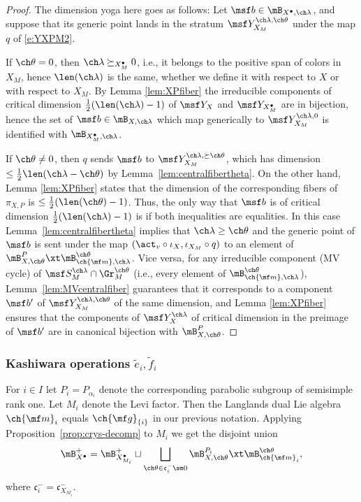 \begin{proof}
The dimension yoga here goes as follows:
Let $\msf b \in \mB_{X^\bullet, \ch\lambda}$, and suppose that its generic point lands in the stratum $\msf Y^{\ch\lambda,\ch\theta}_{X_M}$ under the map $q$ of \eqref{e:YXPM2}.

If $\ch\theta =0$, then $\ch\lambda \succeq_{X_M^\bullet} 0$, i.e., it belongs to the positive span of colors in $X_M$, hence $\len(\ch\lambda)$ is the same, whether we define it with respect to $X$ or with respect to $X_M$. By Lemma \ref{lem:XPfiber} the irreducible components of critical dimension $\frac{1}{2} (\len(\ch\lambda) - 1)$ of $\msf Y_X$ and $\msf Y_{X_M^\bullet}$ are in bijection, hence the set of $\msf b \in \mB_{X,\ch\lambda}$ which map generically to $\msf Y^{\ch\lambda,0}_{X_M}$ is identified with $\mB_{X_M^\bullet,\ch\lambda}$.

If $\ch\theta \ne 0$, then $q$ sends $\msf b$ to $\msf Y^{\ch\lambda, \succeq \ch\theta}_{X_M}$,
which has dimension $\le \frac 1 2 \len(\ch\lambda-\ch\theta)$ by Lemma~\ref{lem:centralfibertheta}.
On the other hand, Lemma \ref{lem:XPfiber} states that the dimension of the corresponding fibers of $\pi_{X,P}$ is $\le \frac{1}{2} (\len(\ch\theta)-1)$. Thus, the only way that $\msf b$ is of critical dimension $\frac{1}{2} (\len(\ch\lambda)-1)$ is if both inequalities are equalities.
In this case Lemma~\ref{lem:centralfibertheta} implies that $\ch\lambda \ge \ch\theta$
and the generic point of $\msf b$ is sent under the map $(\act_v\circ \iota_X,\iota_{X_M}\circ q)$ to an element of $\mB^P_{X,\ch\theta} \xt \mB_{\ch{\mf m}, \ch\lambda}^{\ch\theta}$. Vice versa, for any irreducible component (MV cycle) of  $\msf S^{\ch\lambda}_M\cap \Gr_M^{\ch\theta}$ (i.e., every element of $\mB_{\ch{\mf m},\ch\lambda}^{\ch\theta}$),
Lemma~\ref{lem:MVcentralfiber} guarantees that it corresponds to a component $\msf b'$ of $\msf Y_{X_M}^{\ch\lambda,\ch\theta}$ of the same dimension, and Lemma \ref{lem:XPfiber} ensures that the components of $\msf Y^{\ch\lambda}_X$ of critical dimension in the preimage of $\msf b'$ are in canonical bijection with $\mB^P_{X,\ch\theta}$.
\end{proof}


\subsubsection{Kashiwara operations $\tilde e_i, \tilde f_i$} \label{sect:crystal-ef}
For $i\in I$ let $P_i = P_{\alpha_i}$ denote the corresponding parabolic subgroup of semisimple rank one.
 Let $M_i$ denote the Levi factor. Then the Langlands
dual Lie algebra $\ch{\mf m}_i$ equals $\ch{\mf g}_{\{i\}}$ in our previous notation.
Applying Proposition~\ref{prop:crys-decomp} to $M_i$ we get
the disjoint union
\[ \mB^+_{X^\bullet} = \mB^+_{X_{M_i}^\bullet} \sqcup \bigsqcup_{\ch\theta \in \mathfrak c_i^-\sm 0} \mB^{P_i}_{X,\ch\theta} \xt \mB^{\ch\theta}_{\ch{\mf m}_i},
\]
where $\mathfrak c_i^- = \mathfrak c_{X_{M_i}}^-$.

